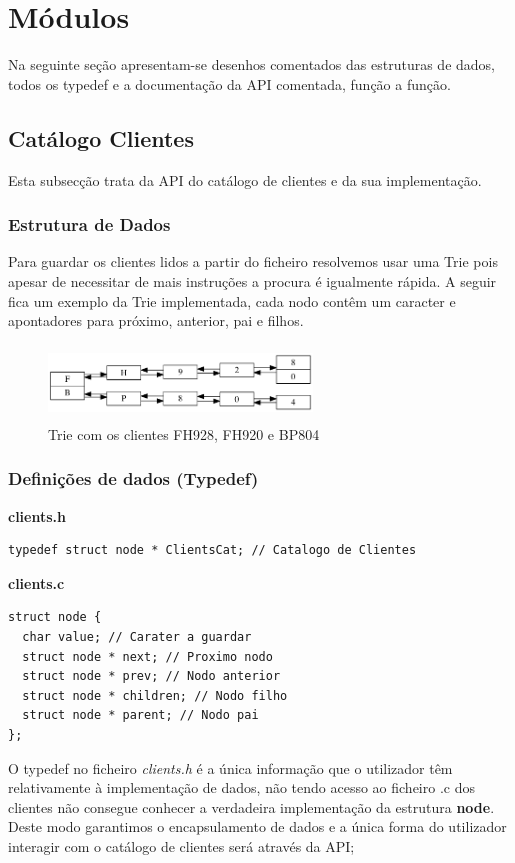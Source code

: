 \documentclass[10pt] {article}
\begin{document}
\newpage
\section{Módulos}
Na seguinte seção apresentam-se desenhos comentados das estruturas de dados,
todos os typedef e a documentação da API comentada, função a função.


\subsection{Catálogo Clientes}
\par Esta subsecção trata da API do catálogo de clientes e da sua implementação.

\subsubsection{Estrutura de Dados}
\par
Para guardar os clientes lidos a partir do ficheiro resolvemos usar uma Trie pois apesar de
necessitar de mais instruções a procura é igualmente rápida. A seguir fica um exemplo da Trie implementada, 
cada nodo contêm um caracter e apontadores para próximo, anterior, pai e filhos.

\begin{figure}[ht!]
\centering
\includegraphics[width=70mm, height=20mm]{trie.png}
\caption{Trie com os clientes FH928, FH920 e BP804}
\end{figure}

\subsubsection{Definições de dados (Typedef)}

\textbf{clients.h}
\begin{lstlisting}
typedef struct node * ClientsCat; // Catalogo de Clientes
\end{lstlisting}
\textbf{clients.c}
\begin{lstlisting}
struct node {
  char value; // Carater a guardar
  struct node * next; // Proximo nodo
  struct node * prev; // Nodo anterior
  struct node * children; // Nodo filho
  struct node * parent; // Nodo pai
};
\end{lstlisting}
\par {O typedef no ficheiro \emph{clients.h} é a única informação que o utilizador têm relativamente à implementação 
de dados, não tendo  acesso ao ficheiro .c dos clientes não consegue conhecer a verdadeira implementação da 
estrutura \textbf{node}. Deste modo garantimos o encapsulamento de dados e a única forma do utilizador interagir 
com o catálogo de clientes será através da API;} \\
\end{document}
